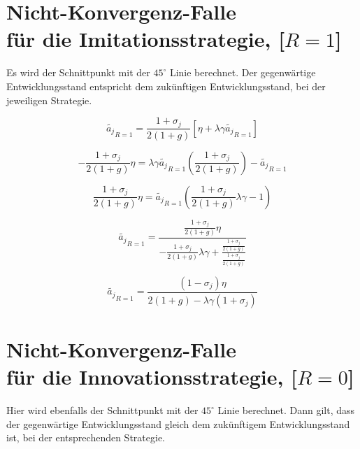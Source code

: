\section[Nicht-Konvergenz-Falle für die Imitationsstrategie, ${[R=1]}$]{Nicht-Konvergenz-Falle \\ für die Imitations\-strategie, [$R=1$] }\label{NichtKonvergenzFalleImitation}


Es wird der Schnittpunkt mit der $45^\circ$ Linie berechnet. Der gegenwärtige Entwicklungsstand entspricht dem zukünftigen Entwicklungsstand, bei der jeweiligen Strategie.


\begin{equation}
\tilde{a_j}_{R=1}=\frac{1+\sigma_j}{2(1+g)}[\eta+\lambda\gamma\tilde{a_j}_{R=1}]
\end{equation}


\begin{equation}
-\frac{1+\sigma_j}{2(1+g)}\eta=\lambda\gamma\tilde{a_j}_{R=1}\left(\frac{1+\sigma_j}{2(1+g)}\right)-\tilde{a_j}_{R=1}
\end{equation}


\begin{equation}
\frac{1+\sigma_j}{2(1+g)}\eta=\tilde{a_j}_{R=1}\left(\frac{1+\sigma_j}{2(1+g)}\lambda\gamma-1\right)
\end{equation}


\begin{equation}
\tilde{a_j}_{R=1}= \frac{\frac{1+\sigma_j}{2(1+g)}\eta}{-\frac{1+\sigma_j}{2(1+g)}\lambda\gamma+\frac{\frac{1+\sigma_j}{2(1+g)}}{\frac{1+\sigma_j}{2(1+g)}}}
\end{equation}


\begin{equation}
\boxed{\tilde{a_j}_{R=1}=\frac{(1-\sigma_j)\eta}{2(1+g)-\lambda\gamma(1+\sigma_j)}}
\end{equation}


\section[Nicht-Konvergenz-Falle für die Innovationsstrategie, ${[R=0]}$]{Nicht-Konvergenz-Falle \\ für die Innovations\-strategie, [$R=0$]}\label{NichtKonvergenzFalleInnovation}


Hier wird ebenfalls der Schnittpunkt mit der $45^\circ$ Linie berechnet. Dann gilt, dass der gegenwärtige Entwicklungsstand gleich dem zukünftigem Entwicklungsstand ist, bei der entsprechenden Strategie.


